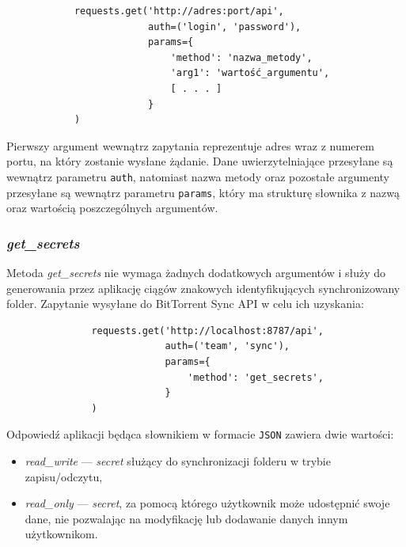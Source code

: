 \documentclass[polish,a4paper,twoside]{ppfcmthesis}
\begin{document}
\begin{minipage}{\linewidth}
\vspace{15pt}
\begin{verbatim}
            requests.get('http://adres:port/api',
                         auth=('login', 'password'),
                         params={
                             'method': 'nazwa_metody',
                             'arg1': 'wartość_argumentu',
                             [ . . . ]
                         }
            )
\end{verbatim}
\vspace{15pt}
\end{minipage}

Pierwszy argument wewnątrz zapytania reprezentuje adres wraz z numerem portu, na który zostanie wysłane żądanie. Dane uwierzytelniające przesyłane są wewnątrz parametru \texttt{auth}, natomiast nazwa metody oraz pozostałe argumenty przesyłane są wewnątrz parametru \texttt{params}, który ma strukturę słownika z nazwą oraz wartością poszczególnych argumentów.

\subsubsection*{\emph{get\_secrets}}

\label{getsecrets}

Metoda \emph{get\_secrets} nie wymaga żadnych dodatkowych argumentów i służy do generowania przez aplikację ciągów znakowych identyfikujących synchronizowany folder.  Zapytanie wysyłane do BitTorrent Sync API w celu ich uzyskania:

\begin{minipage}{\linewidth}
\vspace{15pt}
\begin{verbatim}
               requests.get('http://localhost:8787/api',
                            auth=('team', 'sync'),
                            params={
                                'method': 'get_secrets',
                            }
               )
\end{verbatim}
\vspace{15pt}
\end{minipage}

Odpowiedź aplikacji będąca słownikiem w formacie \texttt{JSON} \cite{jsonarticle} zawiera dwie wartości:

\begin{itemize}[noitemsep]
  \item \emph{read\_write} --- \emph{secret} służący do synchronizacji folderu w trybie zapisu/odczytu,
  \item \emph{read\_only} --- \emph{secret}, za pomocą którego użytkownik może udostępnić swoje dane, nie pozwalając na modyfikację lub dodawanie danych innym użytkownikom.
\end{itemize}
\end{document}
